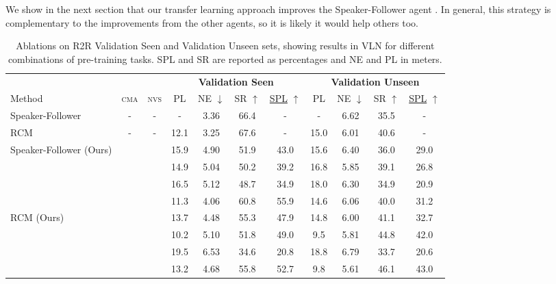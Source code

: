 \documentclass[10pt,twocolumn,letterpaper]{article}
\newcommand{\cmark}{\ding{51}}\newcommand{\xmark}{\ding{55}}\newcommand{\taskcma}{\textsc{cma}}
\newcommand{\tasknvs}{\textsc{nvs}}
\begin{document}
We show in the next section that our transfer learning approach improves the Speaker-Follower agent \cite{Fried:2018:Speaker}. In general, this strategy is complementary to the improvements from the other agents, so it is likely it would help others too.

\begin{table*}
\centering
\setlength\tabcolsep{4.5pt}
\begin{tabular}{lcccccccccc}\\[-0.8em]
                              &  &  & \multicolumn{4}{c}{\textbf{Validation Seen}} & \multicolumn{4}{c}{\textbf{Validation Unseen}}\\\cmidrule(lr{0.1cm}){4-7}\cmidrule(l{0.1cm}){8-11}
Method & {\taskcma} & {\tasknvs}                & PL    & NE $\downarrow$   & SR $\uparrow$   & \underline{SPL} $\uparrow$  & PL    & NE $\downarrow$   & SR $\uparrow$   & \underline{SPL} $\uparrow$   \\[0.2em]\Xhline{2\arrayrulewidth} 
Speaker-Follower \cite{Fried:2018:Speaker}                        &  -      & -      & -    & 3.36 & 66.4 & -    & -    & 6.62 & 35.5 & -\\
RCM\cite{Wang:2018:RCM}                                     & -       & -      & 12.1 & 3.25 & 67.6 & -    & 15.0 & 6.01 & 40.6 & - \\\hline

\multirow{4}{*}{Speaker-Follower (Ours)} & \xmark      &  \xmark        & 15.9 & 4.90 & 51.9 & 43.0 & 15.6 & 6.40 & 36.0 & 29.0 \\
                                        & \cmark   & \xmark      & 14.9 & 5.04 & 50.2 & 39.2 & 16.8 & 5.85 & 39.1 & 26.8 \\
                                        & \xmark   & \cmark       & 16.5    & 5.12    & 48.7    & 34.9    & 18.0    & 6.30    & 34.9    & 20.9    \\
                                        & \cmark  & \cmark & 11.3    & 4.06    & 60.8    & 55.9    & 14.6    & 6.06    & 40.0    & 31.2     \\
\hline
\multirow{4}{*}{RCM (Ours)}              & \xmark  & \xmark & 13.7 & 4.48 & 55.3 & 47.9 & 14.8 & 6.00 & 41.1 & 32.7 \\
                                        & \cmark  & \xmark & 10.2 & 5.10 & 51.8 & 49.0 & 9.5  & 5.81 & 44.8 & 42.0 \\
                                        & \xmark  & \cmark & 19.5    & 6.53    & 34.6    & 20.8    & 18.8    & 6.79    & 33.7    & 20.6   \\
                                        & \cmark  & \cmark & 13.2 & 4.68 & 55.8 & 52.7 & 9.8  & 5.61 & 46.1 & 43.0 \\
\end{tabular}
\caption{Ablations on R2R Validation Seen and Validation Unseen sets, showing results in VLN for different combinations of pre-training tasks. SPL and SR are reported as percentages and NE and PL in meters.}
\label{tab:task-ablation}
\end{table*}
\end{document}
